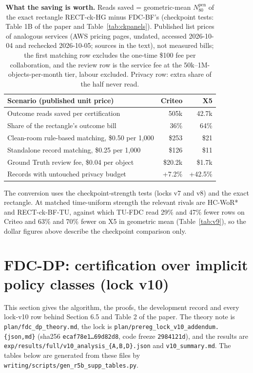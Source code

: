 \documentclass[sigconf,anonymous,review]{acmart}
\newcommand{\Npen}{N_{80}^{\text{pen}}}
\begin{document}
\begin{table}[H]
\caption{\textbf{What the saving is worth.} Reads saved = geometric-mean $\Npen$ of the exact rectangle RECT-ck-HG minus FDC-BF's (checkpoint tests: Table 1B of the paper and Table~\ref{tab:ckpanels}). Published list prices of analogous services (AWS pricing pages, undated, accessed 2026-10-04 and rechecked 2026-10-05; sources in the text), not measured bills; the first matching row excludes the one-time \$100 fee per collaboration, and the review row is the service fee at the 50k--1M-objects-per-month tier, labour excluded. Privacy row: extra share of the half never read.}
\label{tab:cost}
\footnotesize
\setlength{\tabcolsep}{3pt}
\begin{tabular}{@{}lrr@{}}
\toprule
Scenario (published unit price) & Criteo & X5 \\
\midrule
Outcome reads saved per certification & 505k & 42.7k \\
Share of the rectangle's outcome bill & 36\% & 64\% \\
Clean-room rule-based matching, \$0.50 per 1,000 & \$253 & \$21 \\
Standalone record matching, \$0.25 per 1,000 & \$126 & \$11 \\
Ground Truth review fee, \$0.04 per object & \$20.2k & \$1.7k \\
Records with untouched privacy budget & +7.2\% & +42.5\% \\
\bottomrule
\end{tabular}
\end{table}

\noindent The conversion uses the checkpoint-strength tests (locks v7 and v8) and the exact rectangle. At matched time-uniform strength the relevant rivals are HC-WoR* and RECT-ck-BF-TU, against which TU-FDC read 29\% and 47\% fewer rows on Criteo and 63\% and 70\% fewer on X5 in geometric mean (Table~\ref{tab:v9}), so the dollar figures above describe the checkpoint comparison only.

\section{FDC-DP: certification over implicit policy classes (lock v10)}\label{app:fdcdp}

This section gives the algorithm, the proofs, the development record and every lock-v10 row behind Section 6.5 and Table 2 of the paper. The theory note is \texttt{plan/fdc\_dp\_theory.md}, the lock is \texttt{plan/prereg\_lock\_v10\_addendum.\{json,md\}} (sha256 \texttt{ecaf78e1\dots69d82d8}, code freeze \texttt{2984121d}), and the results are \texttt{exp/results/full/v10\_analysis\_\{A,B,D\}.json} and \texttt{v10\_summary.md}. The tables below are generated from these files by \texttt{writing/scripts/gen\_r5b\_supp\_tables.py}.
\end{document}

